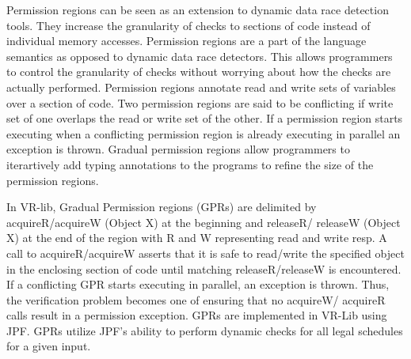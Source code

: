 Permission regions can be seen as an extension to dynamic data race detection
tools. They increase the granularity of checks to sections of code instead of
individual memory accesses. Permission regions are a part of the language
semantics as opposed to dynamic data race detectors. This allows programmers to
control the granularity of checks without worrying about how the checks are
actually performed. Permission regions annotate read and write sets of variables
over a section of code. Two permission regions are said to be conflicting if
write set of one overlaps the read or write set of the other. If a permission
region starts executing when a conflicting permission region is already
executing in parallel an exception is thrown. Gradual permission regions allow
programmers to  iterartively add typing annotations to the programs to refine
the size of the permission regions.

In VR-lib,  Gradual Permission regions (GPRs) are delimited by acquireR/acquireW
(Object X) at the beginning and releaseR/ releaseW (Object X) at the end of the
region with R and W representing read and write resp. A call to
acquireR/acquireW asserts that it is safe to read/write the specified object in
the enclosing section of code until matching releaseR/releaseW is encountered.
If a conflicting GPR starts executing in parallel, an exception is thrown. Thus,
the verification problem becomes one of ensuring that no acquireW/ acquireR
calls result in a permission exception. GPRs are implemented in VR-Lib using
JPF. GPRs utilize JPF's ability to perform dynamic checks for all legal
schedules for a given input. 

